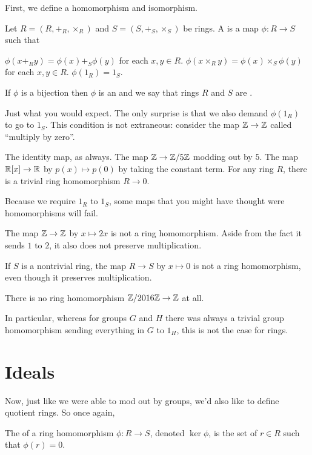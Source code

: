 First, we define a homomorphism and isomorphism.
\begin{definition}
	Let $R = (R, +_R, \times_R)$ and $S = (S, +_S, \times_S)$ be rings.
	A  is a map $\phi : R \to S$
	such that
	\begin{enumerate}[(i)]
		\ii $\phi(x +_R y) = \phi(x) +_S \phi(y)$ for each $x,y \in R$.
		\ii $\phi(x \times_R y) = \phi(x) \times_S \phi(y)$ for each $x,y \in R$.
		\ii $\phi(1_R) = 1_S$.
	\end{enumerate}
	If $\phi$ is a bijection then $\phi$ is an 
	and we say that rings $R$ and $S$ are .
\end{definition}
Just what you would expect.
The only surprise is that we also demand $\phi(1_R)$ to go to $1_S$.
This condition is not extraneous:
consider the map $\mathbb Z \to \mathbb Z$ called ``multiply by zero''.
\begin{example}
	\listhack
	\begin{enumerate}[(a)]
		\ii The identity map, as always.
		\ii The map $\mathbb Z \to \mathbb Z/5\mathbb Z$ modding out by $5$.
		\ii The map $\mathbb R[x] \to \mathbb R$ by $p(x) \mapsto p(0)$
		by taking the constant term.
		\ii For any ring $R$, there is a trivial ring homomorphism $R \to 0$.
	\end{enumerate}
\end{example}
\begin{example}
	Because we require $1_R$ to $1_S$, some maps that you
	might have thought were homomorphisms will fail.
	\begin{enumerate}[(a)]
		\ii The map $\mathbb Z \to \mathbb Z$ by $x \mapsto 2x$
		is not a ring homomorphism.
		Aside from the fact it sends $1$ to $2$,
		it also does not preserve multiplication.

		\ii If $S$ is a nontrivial ring,
		the map $R \to S$ by $x \mapsto 0$ is not
		a ring homomorphism, even though it preserves multiplication.

		\ii There is no ring homomorphism $\mathbb Z/2016\mathbb Z \to \mathbb Z$ at all.
	\end{enumerate}
	In particular, whereas for groups $G$ and $H$
	there was always a trivial group homomorphism sending
	everything in $G$ to $1_H$, this is not the case for rings.
\end{example}

\section{Ideals}
Now, just like we were able to mod out by groups,
we'd also like to define quotient rings.
So once again,
\begin{definition}
	The  of a ring homomorphism $\phi \colon R \to S$,
	denoted $\ker \phi$, is the set of $r \in R$ such that $\phi(r) = 0$.
\end{definition}

